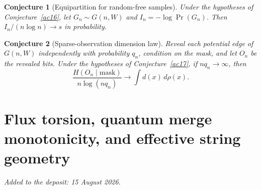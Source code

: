 \documentclass[11pt]{article}
\newtheorem{conjecture}{Conjecture}
\theoremstyle{definition}
\begin{document}
\begin{conjecture}[Equipartition for random-free samples]\label{ac19}
Under the hypotheses of Conjecture~\ref{ac16}, let $G_n\sim G(n,W)$ and $I_n=-\log\Pr(G_n)$.  Then $I_n/(n\log n)\to s$ in probability.
\end{conjecture}

\begin{conjecture}[Sparse-observation dimension law]\label{ac20}
Reveal each potential edge of $G(n,W)$ independently with probability $q_n$, condition on the mask, and let $O_n$ be the revealed bits.  Under the hypotheses of Conjecture~\ref{ac17}, if $nq_n\to\infty$, then
\[
\frac{H(O_n\mid\text{mask})}{n\log(nq_n)}\longrightarrow\int d(x)\,d\rho(x).
\]
\end{conjecture}

\part{Flux torsion, quantum merge monotonicity, and effective string geometry}

\medskip\noindent\emph{Added to the deposit: 15 August 2026.}\par\medskip
\end{document}
